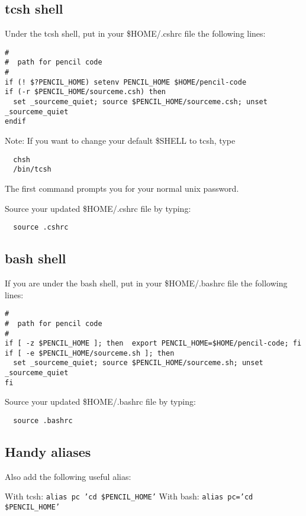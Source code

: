 \documentclass[a4paper,12pt]{article}
\begin{document}
\subsection{tcsh shell}

Under the tcsh shell, put in your \$HOME/.cshrc file the following lines:
\begin{verbatim}
#
#  path for pencil code
#
if (! $?PENCIL_HOME) setenv PENCIL_HOME $HOME/pencil-code
if (-r $PENCIL_HOME/sourceme.csh) then
  set _sourceme_quiet; source $PENCIL_HOME/sourceme.csh; unset _sourceme_quiet
endif
\end{verbatim}

Note: If you want to change your default \$SHELL to tcsh, type

\begin{verbatim}
  chsh
  /bin/tcsh
\end{verbatim}

The first command prompts you for your normal unix password.

Source your updated \$HOME/.cshrc file by typing:
\begin{verbatim}
  source .cshrc
\end{verbatim}

\subsection{bash shell}
If you are under the bash shell, put in your \$HOME/.bashrc file the following
lines:
\begin{verbatim}
#
#  path for pencil code
#
if [ -z $PENCIL_HOME ]; then  export PENCIL_HOME=$HOME/pencil-code; fi
if [ -e $PENCIL_HOME/sourceme.sh ]; then
  set _sourceme_quiet; source $PENCIL_HOME/sourceme.sh; unset _sourceme_quiet
fi
\end{verbatim}

Source your updated \$HOME/.bashrc file by typing:
\begin{verbatim}
  source .bashrc
\end{verbatim}

\subsection{Handy aliases}
Also add the following useful alias:

With tcsh: \texttt{alias pc 'cd \$PENCIL\_HOME'}
With bash: \texttt{alias pc='cd \$PENCIL\_HOME'}
\end{document}
